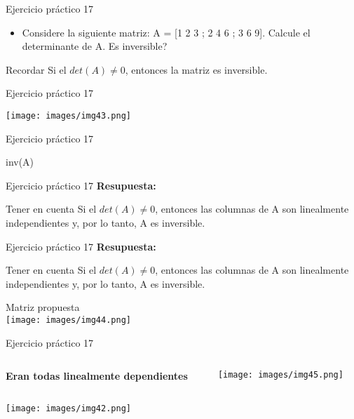 \documentclass{bredelebeamer}
\begin{document}
\begin{frame}{Ejercicio práctico 17}
\begin{center}
\begin{itemize}
\item Considere la siguiente matriz: A = [1 2 3 ; 2 4 6 ; 3 6 9]. Calcule el determinante de A. Es inversible?
\end{itemize}
\end{center}
\begin{block}{Recordar}
Si el $det(A) \neq 0$, entonces la matriz es inversible.
\end{block}
\end{frame}

\begin{frame}{Ejercicio práctico 17}
\begin{center}
\texttt{[image: images/img43.png]}
\end{center}
\end{frame}

\begin{frame}{Ejercicio práctico 17}
\begin{center}
\LARGE inv(A)
\end{center}
\end{frame}

\begin{frame}{Ejercicio práctico 17}
\textbf{Resupuesta:}
\begin{block}{Tener en cuenta}
Si el $det(A)\neq 0$, entonces las columnas de A son linealmente independientes y, por lo tanto, A es inversible.
\end{block}
\end{frame}

\begin{frame}{Ejercicio práctico 17}
\textbf{Resupuesta:}
\begin{block}{Tener en cuenta}
Si el $det(A)\neq 0$, entonces las columnas de A son linealmente independientes y, por lo tanto, A es inversible.
\end{block}
\begin{center}
Matriz propuesta\\
\texttt{[image: images/img44.png]}
\end{center}
\end{frame}

\begin{frame}{Ejercicio práctico 17}
\begin{columns}
\begin{column}{0.6\textwidth}
\begin{center}
\textbf{Eran todas linealmente dependientes }
\end{center}
\end{column}
\begin{column}{0.3\textwidth}
\begin{center}
\texttt{[image: images/img45.png]}
\end{center}
\end{column}
\end{columns}
\begin{center}
\texttt{[image: images/img42.png]}
\end{center}
\end{frame}
\end{document}
